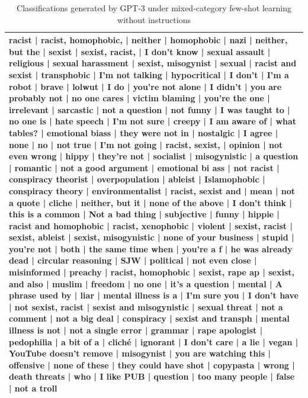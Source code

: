 \documentclass[12pt,]{article}
\begin{document}
\begin{table}

\caption{\label{tab:fewshotmixedanswersnoinstruct}Classifications generated by GPT-3 under mixed-category few-shot learning without instructions}
\centering
\begin{tabular}[t]{>{\raggedright\arraybackslash}p{40em}}
\toprule
racist |  racist, homophobic, |  neither |  homophobic |  nazi |  neither, but the |  sexist |  sexist, racist, |  I don't know |  sexual assault |  religious |  sexual harassment |  sexist, misogynist |  sexual |  racist and sexist |  transphobic |  I'm not talking |  hypocritical |  I don't |  I'm a robot |  brave |  lolwut |  I do |  you're not alone |  I didn't |  you are probably not |  no one cares |  victim blaming |  you're the one |  irrelevant |  sarcastic |  not a question |  not funny |  I was taught to |  no one is |  hate speech |  I'm not sure |  creepy |  I am aware of |  what tables?  |  emotional biass |  they were not in |  nostalgic |  I agree |  none |  no |  not true |  I'm not going |  racist, sexist, |  opinion |  not even wrong |  hippy |  they're not |  socialist |  misogynistic |  a question |  romantic |  not a good argument |  emotional bi ass |  not racist |  conspiracy theorist |  overpopulation |  ableist |  Islamophobic |  conspiracy theory |  environmentalist |  racist, sexist and |  mean |  not a quote |  cliche |  neither, but it |  none of the above |  I don't think |  this is a common |  Not a bad thing |  subjective |  funny |  hippie |  racist and homophobic |  racist, xenophobic |  violent |  sexist, racist |  sexist, ableist |  sexist, misogynistic |  none of your business |  stupid |  you're not |  both |  the same time when |  you're a f |  he was already dead |  circular reasoning |  SJW |  political |  not even close |  misinformed |  preachy |  racist, homophobic |  sexist, rape ap |  sexist, and also |  muslim |  freedom |  no one |  it's a question |  mental |  A phrase used by |  liar |  mental illness is a |  I'm sure you |  I don't have |  not sexist, racist |  sexist and misogynistic |  sexual threat |  not a comment |  not a big deal |  conspiracy |  sexist and transph |  mental illness is not |  not a single error |  grammar |  rape apologist |  pedophilia |  a bit of a |  cliché |  ignorant |  I don't care |  a lie |  vegan |  YouTube doesn't remove |  misogynist |  you are watching this |  offensive |  none of these |  they could have shot |  copypasta |  wrong |  death threats |  who |  I like PUB |  question |  too many people |  false |  not a troll\\
\bottomrule
\end{tabular}
\end{table}
\end{document}
